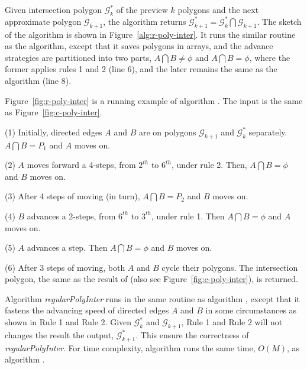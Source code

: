 Given intersection polygon $\mathcal{G}^*_k$ of the preview $k$ polygons and the next approximate polygon $\mathcal{G}_{k+1}$, the algorithm \rpia returns $\mathcal{G}^*_{k+1} = \mathcal{G}^*_k  \bigcap \mathcal{G}_{k+1}$.
The sketch of the algorithm is shown in Figure~\ref{alg:r-poly-inter}.
%
It runs the similar routine as the \cpia algorithm, except that it saves polygons in arrays, and the advance strategies are partitioned into two parts, \ie $A \bigcap B \ne \phi$ and $A \bigcap B = \phi$, where the former applies rules 1 and 2 (line 6), and the later remains the same as the \cpia algorithm (line 8).








\begin{example}
Figure~\ref{fig:r-poly-inter} is a running example of algorithm \rpia. The input is the same as Figure~\ref{fig:c-poly-inter}.

\ni (1) Initially, directed edges $A$ and $B$ are on polygons $\mathcal{G}_{k+1}$ and $\mathcal{G}^*_{k}$ separately. $A \bigcap B = P_1$ and $A$ moves on.

\ni (2) $A$ moves forward a 4-steps, from $2^{th}$ to $6^{th}$, under rule 2. Then, $A \bigcap B = \phi$ and $B$ moves on.

\ni (3) After 4 steps of moving (in turn), $A \bigcap B = P_2$ and $B$ moves on.

\ni (4) $B$ advances a 2-steps, from $6^{th}$ to $3^{th}$, under rule 1. Then $A \bigcap B = \phi$ and $A$ moves on.

\ni (5) $A$ advances a step. Then $A \bigcap B = \phi$ and $B$ moves on.

\ni (6) After 3 steps of moving, both $A$ and $B$ cycle their polygons. The intersection polygon, the same as the result of \cpia (also see Figure~\ref{fig:c-poly-inter}), is returned.
\end{example}



Algorithm \emph{regularPolyInter} runs in the same routine as algorithm \cpia, except that it fastens the advancing speed of directed edges $A$ and $B$ in some circumstances as shown in Rule 1 and Rule 2. Given $\mathcal{G}^*_k$ and $\mathcal{G}_{k+1}$,  Rule 1 and Rule 2 will not changes the result the output, \ie $\mathcal{G}^*_{k+1}$. This ensure the correctness of \emph{regularPolyInter}.
For time complexity, algorithm \rpia runs the same time, $O(M)$, as algorithm \cpia.



